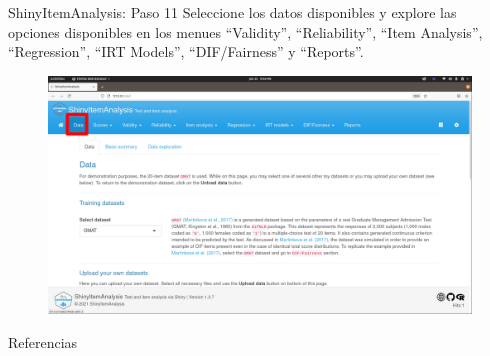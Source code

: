 \documentclass{beamer}
\begin{document}
\begin{frame}{ShinyItemAnalysis: Paso 11}
Seleccione los datos disponibles y explore las opciones disponibles en los menues ``Validity'', ``Reliability'', ``Item Analysis'', ``Regression'', ``IRT Models'', ``DIF/Fairness'' y ``Reports''.
\begin{figure}
\centering
\includegraphics[width=.85\textwidth]{Paso10.png}
\end{figure}  
\end{frame}






\begin{frame}[allowframebreaks]{Referencias}
\tiny{ 


}
\end{frame}
\end{document}
